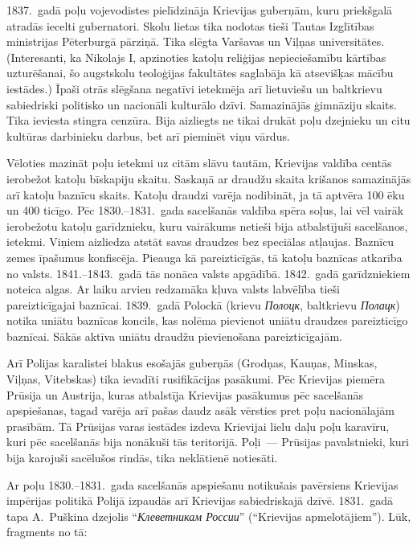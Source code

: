 \documentclass[twoside,a5paper,12pt,fleqn,openany]{extbook}
\newcommand{\rutxti}[1]{\textit{\textrussian{#1}}}
\begin{document}
1837.~gadā poļu vojevodistes pielīdzināja Krievijas guberņām, kuru priekšgalā atradās iecelti gubernatori. Skolu lietas tika nodotas tieši Tautas Izglītības ministrijas Pēterburgā pārziņā. Tika slēgta Varšavas un Viļņas universitātes. (Interesanti, ka Nikolajs I, apzinoties katoļu reliģijas nepieciešamību kārtības uzturēšanai, šo augstskolu teoloģijas fakultātes saglabāja kā atsevišķas mācību iestādes.) Īpaši otrās slēgšana negatīvi ietekmēja arī lietuviešu un baltkrievu sabiedriski politisko un nacionāli kulturālo dzīvi. Samazinājās ģimnāziju skaits. Tika ieviesta stingra cenzūra. Bija aizliegts ne tikai drukāt poļu dzejnieku un citu kultūras darbinieku darbus, bet arī pieminēt viņu vārdus.

Vēloties mazināt poļu ietekmi uz citām slāvu tautām, Krievijas valdība centās ierobežot katoļu bīskapiju skaitu. Saskaņā ar draudžu skaita krišanos samazinājās arī katoļu baznīcu skaits. Katoļu draudzi varēja nodibināt, ja tā aptvēra 100 ēku un 400 ticīgo. Pēc 1830.--1831.~gada sacelšanās valdība spēra soļus, lai vēl vairāk ierobežotu katoļu garīdznieku, kuru vairākums netieši bija atbalstījuši sacelšanos, ietekmi. Viņiem aizliedza atstāt savas draudzes bez speciālas atļaujas. Baznīcu zemes īpašumus konfiscēja. Pieauga kā pareizticīgās, tā katoļu baznīcas atkarība no valsts. 1841.--1843.~gadā tās nonāca valsts apgādībā. 1842.~gadā garīdzniekiem noteica algas. Ar laiku arvien redzamāka kļuva valsts labvēlība tieši pareizticīgajai baznīcai. 1839.~gadā Polockā (krievu \rutxti{Полоцк}, baltkrievu \rutxti{Полацк}) notika uniātu baznīcas koncils, kas nolēma pievienot uniātu draudzes pareizticīgo baznīcai. Sākās aktīva uniātu draudžu pievienošana pareizticīgajām.

Arī Polijas karalistei blakus esošajās guberņās (Grodņas, Kauņas, Minskas, Viļņas, Vitebskas) tika ievadīti rusifikācijas pasākumi. Pēc Krievijas piemēra Prūsija un Austrija, kuras atbalstīja Krievijas pasākumus pēc sacelšanās apspiešanas, tagad varēja arī pašas daudz asāk vērsties pret poļu nacionālajām prasībām. Tā Prūsijas varas iestādes izdeva Krievijai lielu daļu poļu karavīru, kuri pēc sacelšanās bija nonākuši tās teritorijā. Poļi~--- Prūsijas pavalstnieki, kuri bija karojuši sacēlušos rindās, tika neklātienē notiesāti.

Ar poļu 1830.--1831.~gada sacelšanās apspiešanu notikušais pavērsiens Krievijas impērijas politikā Polijā izpaudās arī Krievijas sabiedriskajā dzīvē. 1831.~gadā tapa A.~Puškina dzejolis ``\rutxti{Клеветникам России}'' (``Krievijas apmelotājiem''). Lūk, fragments no tā:
\end{document}
